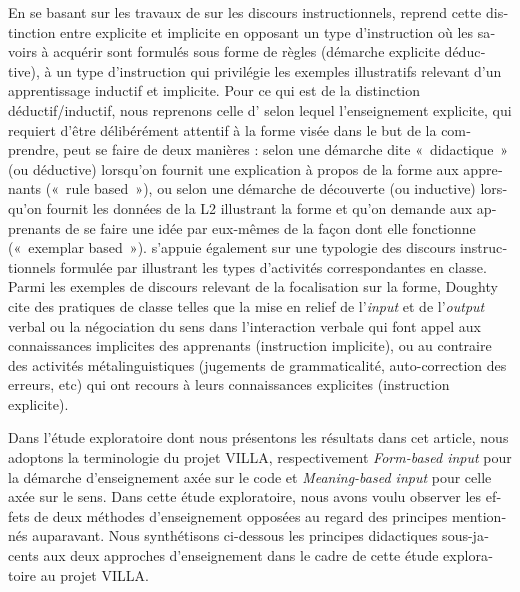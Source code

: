 \documentclass[output=paper]{langscibook}
\begin{document}
\begin{otherlanguage}{french}
En se basant sur les travaux de \citet{Doughty2003} sur les discours instructionnels, \citet{Véronique2019} reprend cette distinction entre explicite et implicite en opposant un type d’instruction où les savoirs à acquérir sont formulés sous forme de règles (démarche explicite déductive), à un type d’instruction qui privilégie les exemples illustratifs relevant d’un apprentissage inductif et implicite. Pour ce qui est de la distinction déductif/inductif, nous reprenons celle d’\citet{Ellis2005} selon lequel l'enseignement explicite, qui requiert d'être délibérément attentif à la forme visée dans le but de la comprendre, peut se faire de deux manières : selon une démarche dite «~didactique~» (ou déductive) lorsqu'on fournit une explication à propos de la forme aux apprenants («~rule based~»), ou selon une démarche de découverte (ou inductive) lorsqu'on fournit les données de la L2 illustrant la forme et qu'on demande aux apprenants de se faire une idée par eux-mêmes de la façon dont elle fonctionne («~exemplar based~»). \citet{Véronique2019} s’appuie également sur une typologie des discours instructionnels formulée par \citet{Doughty2003} illustrant les types d’activités correspondantes en classe. Parmi les exemples de discours relevant de la focalisation sur la forme, Doughty cite des pratiques de classe telles que la mise en relief de l’\textit{input} et de l’\textit{output} verbal ou la négociation du sens dans l’interaction verbale qui font appel aux connaissances implicites des apprenants (instruction implicite), ou au contraire des activités métalinguistiques (jugements de grammaticalité, auto-correction des erreurs, etc) qui ont recours à leurs connaissances explicites (instruction explicite).


Dans l’étude exploratoire dont nous présentons les résultats dans cet article, nous adoptons la terminologie du projet VILLA, respectivement \textit{Form-based input} pour la démarche d’enseignement axée sur le code et \textit{Meaning-based input} pour celle axée sur le sens. Dans cette étude exploratoire, nous avons voulu observer les effets de deux méthodes d’enseignement opposées au regard des principes mentionnés auparavant. Nous synthétisons ci-dessous les principes didactiques sous-jacents aux deux approches d’enseignement dans le cadre de cette étude exploratoire au projet VILLA.




\end{otherlanguage}
\end{document}
